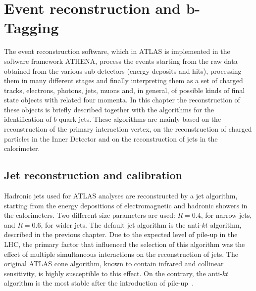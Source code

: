 %
%

\chapter{Event reconstruction and $\bm b$-Tagging }\label{ch:reco}


The event reconstruction software, which in ATLAS is implemented in the software framework ATHENA, process the events starting from the raw data obtained from the various sub-detectors (energy deposits and hits), processing them in many different stages and finally interpreting them as a set of charged tracks, electrons, photons, jets, muons and, in general, of possible kinds of final state objects with related four momenta.  
In this chapter the reconstruction of these objects is briefly described together with the algorithms for the identification of $b$-quark jets.  These algorithms are mainly based on the reconstruction of the primary interaction vertex, on the reconstruction of charged particles in the Inner Detector and on the reconstruction of jets in the calorimeter.   

\section{Jet reconstruction and calibration}\label{sec:ObjSelection}

Hadronic jets used for ATLAS analyses are reconstructed by a jet algorithm, starting from the energy depositions of electromagnetic and hadronic showers in the calorimeters.  Two different size parameters are used: $R = 0.4$, for narrow jets, and $R = 0.6$, for wider jets. The default jet algorithm is the anti-$kt$ algorithm, described in the previous chapter. Due to the expected level of pile-up in the LHC, the primary factor that influenced the selection of this algorithm was the effect of multiple simultaneous interactions on the reconstruction of jets. The original ATLAS cone algorithm, known to contain infrared and collinear sensitivity, is highly susceptible to this effect. On the contrary, the anti-$kt$ algorithm is the most stable after the introduction of pile-up~\cite{Asquith:1311867}.  

